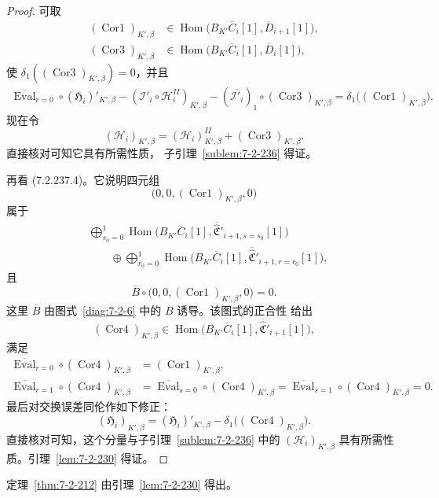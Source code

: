 \begin{proof}
可取
\[
\begin{aligned}
(\operatorname{Cor1})_{K',\beta}
&\in\operatorname{Hom}\bigl(
B_{K'}\overline C_i[1],\overline D_{i+1}[1]
\bigr),\\
(\operatorname{Cor3})_{K',\beta}
&\in\operatorname{Hom}\bigl(
B_{K'}\overline C_i[1],\overline D_i[1]
\bigr),
\end{aligned}
\]
使 $\delta_1((\operatorname{Cor3})_{K',\beta})=0$，并且
\[
\begin{aligned}
\overline{\operatorname{Eval}}_{r=0}\circ
(\mathfrak H_i)'_{K',\beta}
-(\mathcal I'_i\circ\mathcal H_i^{II})_{K',\beta}
-(\overline{\mathcal I'_i})_1\circ
(\operatorname{Cor3})_{K',\beta}
=\delta_1\bigl((\operatorname{Cor1})_{K',\beta}\bigr).
\end{aligned}
\]
现在令
\[
(\mathcal H_i)_{K',\beta}
=(\mathcal H_i)^{II}_{K',\beta}
+(\operatorname{Cor3})_{K',\beta}.
\]
直接核对可知它具有所需性质，
子引理~\ref{sublem:7-2-236} 得证。

再看 (7.2.237.4)。它说明四元组
\[
\bigl(0,0,(\operatorname{Cor1})_{K',\beta},0\bigr)
\]
属于
\[
\begin{aligned}
&\bigoplus_{s_0=0}^{1}\operatorname{Hom}\bigl(
B_{K'}\overline C_i[1],
\overline{\widehat{\mathfrak C}}'_{i+1,s=s_0}[1]
\bigr)\\
&\qquad\oplus
\bigoplus_{r_0=0}^{1}\operatorname{Hom}\bigl(
B_{K'}\overline C_i[1],
\overline{\widehat{\mathfrak C}}'_{i+1,r=r_0}[1]
\bigr),
\end{aligned}
\]
且
\[
\overline B\circ
\bigl(0,0,(\operatorname{Cor1})_{K',\beta},0\bigr)=0.
\]
这里 $\overline B$ 由图式~\ref{diag:7-2-6}
中的 $B$ 诱导。该图式的正合性
给出
\[
(\operatorname{Cor4})_{K',\beta}
\in\operatorname{Hom}\bigl(
B_{K'}\overline C_i[1],
\overline{\widehat{\mathfrak C}}'_{i+1}[1]
\bigr),
\]
满足
\[
\begin{aligned}
\overline{\operatorname{Eval}}_{r=0}\circ
(\operatorname{Cor4})_{K',\beta}
&=(\operatorname{Cor1})_{K',\beta},\\
\overline{\operatorname{Eval}}_{r=1}\circ
(\operatorname{Cor4})_{K',\beta}
&=\overline{\operatorname{Eval}}_{s=0}\circ
(\operatorname{Cor4})_{K',\beta}
=\overline{\operatorname{Eval}}_{s=1}\circ
(\operatorname{Cor4})_{K',\beta}=0.
\end{aligned}
\]
最后对交换误差同伦作如下修正：
\begin{equation}
(\mathfrak H_i)_{K',\beta}
=(\mathfrak H_i)'_{K',\beta}
-\delta_1\bigl((\operatorname{Cor4})_{K',\beta}\bigr).
\tag{7.2.242}\label{eq:7-2-242}
\end{equation}
直接核对可知，这个分量与子引理~\ref{sublem:7-2-236}
中的 $(\mathcal H_i)_{K',\beta}$
具有所需性质。引理~\ref{lem:7-2-230} 得证。
\end{proof}

定理~\ref{thm:7-2-212}
由引理~\ref{lem:7-2-230} 得出。
